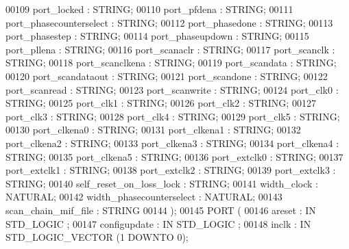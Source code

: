 \begin{DoxyCode}
{00109         port\_locked     : \textcolor{comment}{STRING};
00110         port\_pfdena     : \textcolor{comment}{STRING};
00111         port\_phasecounterselect     : \textcolor{comment}{STRING};
00112         port\_phasedone      : \textcolor{comment}{STRING};
00113         port\_phasestep      : \textcolor{comment}{STRING};
00114         port\_phaseupdown        : \textcolor{comment}{STRING};
00115         port\_pllena     : \textcolor{comment}{STRING};
00116         port\_scanaclr       : \textcolor{comment}{STRING};
00117         port\_scanclk        : \textcolor{comment}{STRING};
00118         port\_scanclkena     : \textcolor{comment}{STRING};
00119         port\_scandata       : \textcolor{comment}{STRING};
00120         port\_scandataout        : \textcolor{comment}{STRING};
00121         port\_scandone       : \textcolor{comment}{STRING};
00122         port\_scanread       : \textcolor{comment}{STRING};
00123         port\_scanwrite      : \textcolor{comment}{STRING};
00124         port\_clk0       : \textcolor{comment}{STRING};
00125         port\_clk1       : \textcolor{comment}{STRING};
00126         port\_clk2       : \textcolor{comment}{STRING};
00127         port\_clk3       : \textcolor{comment}{STRING};
00128         port\_clk4       : \textcolor{comment}{STRING};
00129         port\_clk5       : \textcolor{comment}{STRING};
00130         port\_clkena0        : \textcolor{comment}{STRING};
00131         port\_clkena1        : \textcolor{comment}{STRING};
00132         port\_clkena2        : \textcolor{comment}{STRING};
00133         port\_clkena3        : \textcolor{comment}{STRING};
00134         port\_clkena4        : \textcolor{comment}{STRING};
00135         port\_clkena5        : \textcolor{comment}{STRING};
00136         port\_extclk0        : \textcolor{comment}{STRING};
00137         port\_extclk1        : \textcolor{comment}{STRING};
00138         port\_extclk2        : \textcolor{comment}{STRING};
00139         port\_extclk3        : \textcolor{comment}{STRING};
00140         self\_reset\_on\_loss\_lock     : \textcolor{comment}{STRING};
00141         width\_clock     : \textcolor{comment}{NATURAL};
00142         width\_phasecounterselect        : \textcolor{comment}{NATURAL};
00143         scan\_chain\_mif\_file     : \textcolor{comment}{STRING}
00144     );
00145     \textcolor{keywordflow}{PORT} (
00146             areset  : \textcolor{keywordflow}{IN} \textcolor{comment}{STD\_LOGIC} ;
00147             configupdate    : \textcolor{keywordflow}{IN} \textcolor{comment}{STD\_LOGIC} ;
00148             inclk   : \textcolor{keywordflow}{IN} \textcolor{comment}{STD\_LOGIC\_VECTOR} (\textcolor{vhdllogic}{}\textcolor{vhdllogic}{1} \textcolor{keywordflow}{DOWNTO} \textcolor{vhdllogic}{}\textcolor{vhdllogic}{0});
}
\end{DoxyCode}
